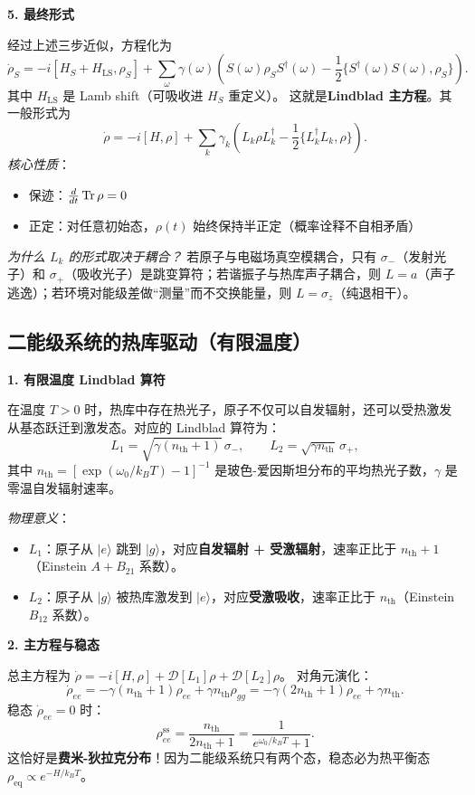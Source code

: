 \textbf{5. 最终形式}

经过上述三步近似，方程化为
\[
\dot{\rho}_S = -i[H_S+H_{\text{LS}}, \rho_S] + \sum_{\omega} \gamma(\omega)\left( S(\omega)\rho_S S^\dagger(\omega) - \frac{1}{2}\{S^\dagger(\omega)S(\omega), \rho_S\} \right).
\]
其中 $H_{\text{LS}}$ 是 Lamb shift（可吸收进 $H_S$ 重定义）。
这就是\textbf{Lindblad 主方程}。其一般形式为
\[
\boxed{\dot{\rho} = -i[H,\rho] + \sum_k \gamma_k \left( L_k\rho L_k^\dagger - \frac{1}{2}\{L_k^\dagger L_k, \rho\} \right)}.
\]
\textit{核心性质}：
\begin{itemize}[nosep]
    \item 保迹：$\frac{d}{dt}\Tr\rho = 0$
    \item 正定：对任意初始态，$\rho(t)$ 始终保持半正定（概率诠释不自相矛盾）
\end{itemize}

\textit{为什么 $L_k$ 的形式取决于耦合？}
若原子与电磁场真空模耦合，只有 $\sigma_-$（发射光子）和 $\sigma_+$（吸收光子）是跳变算符；若谐振子与热库声子耦合，则 $L=a$（声子逃逸）；若环境对能级差做``测量''而不交换能量，则 $L=\sigma_z$（纯退相干）。

\subsection{二能级系统的热库驱动（有限温度）}

\textbf{1. 有限温度 Lindblad 算符}

在温度 $T>0$ 时，热库中存在热光子，原子不仅可以自发辐射，还可以受热激发从基态跃迁到激发态。对应的 Lindblad 算符为：
\[
L_1 = \sqrt{\gamma(n_{\text{th}}+1)}\,\sigma_-, \qquad
L_2 = \sqrt{\gamma n_{\text{th}}}\,\sigma_+,
\]
其中 $n_{\text{th}} = [\exp(\omega_0/k_B T)-1]^{-1}$ 是玻色-爱因斯坦分布的平均热光子数，$\gamma$ 是零温自发辐射速率。

\textit{物理意义}：
\begin{itemize}[nosep]
    \item $L_1$：原子从 $|e\rangle$ 跳到 $|g\rangle$，对应\textbf{自发辐射 + 受激辐射}，速率正比于 $n_{\text{th}}+1$（Einstein $A+B_{21}$ 系数）。
    \item $L_2$：原子从 $|g\rangle$ 被热库激发到 $|e\rangle$，对应\textbf{受激吸收}，速率正比于 $n_{\text{th}}$（Einstein $B_{12}$ 系数）。
\end{itemize}

\textbf{2. 主方程与稳态}

总主方程为 $\dot{\rho} = -i[H,\rho] + \mathcal{D}[L_1]\rho + \mathcal{D}[L_2]\rho$。
对角元演化：
\[
\dot{\rho}_{ee} = -\gamma(n_{\text{th}}+1)\rho_{ee} + \gamma n_{\text{th}}\rho_{gg}
= -\gamma(2n_{\text{th}}+1)\rho_{ee} + \gamma n_{\text{th}}.
\]
稳态 $\dot{\rho}_{ee}=0$ 时：
\[
\rho_{ee}^{\text{ss}} = \frac{n_{\text{th}}}{2n_{\text{th}}+1} = \frac{1}{e^{\omega_0/k_B T}+1}.
\]
这恰好是\textbf{费米-狄拉克分布}！因为二能级系统只有两个态，稳态必为热平衡态 $\rho_{\text{eq}} \propto e^{-H/k_B T}$。

